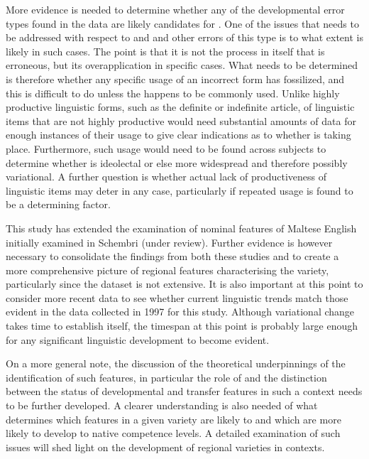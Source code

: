 \documentclass[output=paper]{langsci/langscibook}
\begin{document}
More evidence is needed to determine whether any of the developmental
error types found in the data are likely candidates for
. One of the issues that needs to be addressed with
respect to  and  and other errors of this type is
to what extent  is likely in such cases. The point is
that it is not the  process in itself that is erroneous, but
its overapplication in specific cases. What needs to be determined is
therefore whether any specific usage of an incorrect form has
fossilized, and this is difficult to do unless the  happens to be
commonly used. Unlike highly productive linguistic forms, such as the
definite or indefinite article,  of linguistic items that
are not highly productive would need substantial amounts of data for
enough instances of their usage to give clear indications as to
whether  is taking place. Furthermore, such usage would
need to be found across subjects to determine whether  is
ideolectal or else more widespread and therefore possibly
variational. A further 
question is whether actual lack of
productiveness of linguistic items may deter  in any
case, particularly if repeated usage is found to be a determining
factor.


This study has extended the examination of nominal features of Maltese
English initially examined in Schembri (under review). Further
evidence is however necessary to consolidate the findings from both
these studies and to create a more comprehensive picture of regional
features characterising the variety, particularly since the dataset is
not extensive. It is also important at this point to consider more
recent data to see whether current linguistic trends match those
evident in the data collected in 1997 for this study. Although
variational change takes time to establish itself, the timespan at
this point is probably large enough for any significant linguistic
development to become evident.



On a more general note, the discussion of the theoretical
underpinnings of the identification of such features, in particular
the role of  and the distinction between the status of
developmental and transfer features in such a context needs to be
further developed. A clearer understanding is also needed of what
determines which features in a given variety are likely to 
and which are more likely to develop to native  competence
levels. A detailed examination of such issues will shed light on the
development of regional varieties in  contexts.

 
 
 
 
 

\sloppy
\printbibliography[heading=subbibliography,notkeyword=this] 
\end{document}
